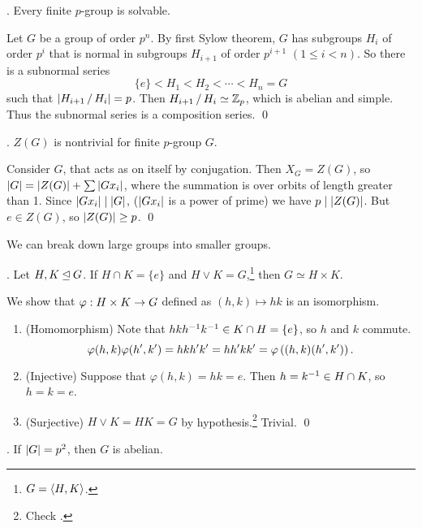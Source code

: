 
\thm. Every finite \(p\)-group is solvable.

\pf Let \(G\) be a group of order \(p^n\). By first Sylow theorem, \(G\) has subgroups \(H_i\) of order \(p^i\) that is normal in subgroups \(H_{i+1}\) of order \(p^{i+1}\) \((1 \leq i < n)\). So there is a subnormal series
\[
    \{e\} < H_1 < H_2 < \cdots < H_n = G
\]
such that \(\left| H_{i+1} \operatorname{/} H_i \right| = p\). Then \(H_{i+1} \operatorname{/} H_i \simeq \mathbb{Z}_p\), which is abelian and simple. Thus the subnormal series is a composition series. \qed

\thm. \(Z(G)\) is nontrivial for finite \(p\)-group \(G\).

\pf Consider \(G\), that acts as on itself by conjugation. Then \(X_G = Z(G)\), so \(\left| G \right| = \left| Z(G) \right| + \sum \left| Gx_i \right|\), where the summation is over orbits of length greater than 1. Since \(\left| Gx_i \right| \mid \left| G \right|\), (\(\left| Gx_i \right|\) is a power of prime) we have \(p \mid \left| Z(G) \right|\). But \(e \in Z(G)\), so \(\left| Z(G) \right| \geq p\). \qed

We can break down large groups into smaller groups.

\lemma. Let \(H, K \unlhd G\). If \(H \cap K = \{e\}\) and \(H \vee K = G\),\footnote{\(G = \left\langle H, K \right\rangle\).} then \(G \simeq H \times K\).

\pf We show that \(\varphi : H \times K \rightarrow G\) defined as \((h, k) \mapsto hk\) is an isomorphism.
\begin{enumerate}
    \item (Homomorphism) Note that \(hkh^{-1} k^{-1} \in K \cap H = \{e\}\), so \(h\) and \(k\) commute.
    \[
        \varphi(h, k) \varphi(h', k') = hkh'k' = hh'kk' = \varphi\left( (h, k)(h', k') \right).
    \]
    \item (Injective) Suppose that \(\varphi(h, k) = hk = e\). Then \(h = k^{-1} \in H\cap K\), so \(h = k = e\).
    \item (Surjective) \(H \vee K = HK = G\) by hypothesis.\footnote{Check .} Trivial. \qed
\end{enumerate}

\thm. If \(\left| G \right| = p^2\), then \(G\) is abelian.

